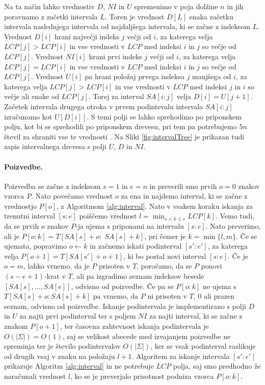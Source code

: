 Na ta način lahko vrednostiv $D$, $NI$ in $U$ spremenimo v poja dolžine $n$ in jih poravnamo z začetki intervala $L$. Toren je vrednost $D[L]$ enaka začetku intervala naslednjega intervala od najdaljšega intervala, ki se začne z indeksom $L$. Vrednost $D[i]$ hrani največji indeks $j$ večji od $i$, za katerega velja $LCP[j]>LCP[i]$ in vse vrednosti v $LCP$ med indeksi $i$ in $j$ so večje od $LCP[j]$. Vrednost $NI[i]$ hrani prvi indeks $j$ večji od $i$, za katerega velja $LCP[j]=LCP[i]$ in vse vrednosti v $LCP$ med indeksi $i$ in $j$ so večje od $LCP[j]$. Vrednost $U[i]$ pa hrani položaj prvega indeksa $j$ manjšega od $i$, za katerega velja $LCP[j]>LCP[i]$ in vse vrednosti v $LCP$ med indeksi $j$ in $i$ so večje ali enake od $LCP[j]$. Torej za interval $SA[i:j]$ velja $D[i]=U[j+1]$. Začetek intervala drugega otroka v prvem podintevalu intervala $SA[i:j]$ izračunamo kot $U[D[i]]$. S temi polji se lahko sprehodimo po priponskem polju, kot bi se sprehodili po priponskem drevesu, pri tem pa potrebujemo $5n$ števil za shraniti vse te vrednosti \cite{Abouelhoda2004}. Na Sliki \ref{fig:intervalTree} je prikazan tudi zapis intervalnega drevesa s polji $U$, $D$ in $NI$. 

\paragraph{Poizvedbe.}
Poizvedba se začne z indeksom $s=1$ in $e=n$ in preverili smo prvih $o=0$ znakov vzorca $P$. Nato povečamo vrednost $o$ za ena in najdemo interval, ki se začne z vrednostjo $P[o]$, z Algoritmom \ref{alg:interval}. Nato v vsakem koraku iskanja za trenutni interval $[s:e]$ poiščemo vrednost $l=\min_{s<k\le e}LCP[k]$. Vemo tudi, da se prvih $o$ znakov $P$-ja ujema s priponami na intervalu $[s:e]$. Nato preverimo, ali je $P[o:k]=T[SA[s]+o:\; SA[s]+k]$, pri čemer je $k=\min\{l,m\}$. Če se ujemata, popravimo $o\leftarrow k$ in začnemo iskati podinterval $[s':e']$, za katerega velja $P[o+1]=T[SA[s']+o+1]$, ki bo postal novi interval $[s:e]$. Če je $o=m$, lahko vrnemo, da je $P$ prisoten v $T$, poročamo, da se $P$ ponovi $(s-e+1)$-krat v $T$, ali pa izgradimo seznam indeksov besede $[SA[s],\dots,SA[e]]$, odvisno od poizvedbe. Če pa se $P[o:k]$ ne ujema s $T[SA[s]+o:SA[s]+k]$ pa vrnemo, da $P$ ni prisoten v $T$, 0 ali prazen seznam, odvisno od poizvedbe. Iskanje podintervala je implementirano s polji $D$ in $U$ za najti prvi podinterval ter s poljem $NI$ za najti interval, ki se začne z znakom $P[o+1]$, ter časovna zahtevnost iskanja podintervala je $O(|\Sigma|)=O(1)$, saj se velikost abecede med izvajanjem poizvedbe ne spreminja ter je število podintervalov $O(|\Sigma|)$, ker se vsak podinterval razlikuje od drugih vsaj v znaku na položaju $l+1$. Algoritem za iskanje intervala $[s':e']$ prikazuje Algoritm \ref{alg:interval} in ne potrebuje $LCP$ polja, saj smo predhodno že naračunali vrednost $l$, ko se je preverjalo prisotnost podniza vzorca $P[o:k]$. 


